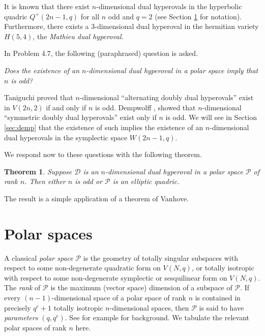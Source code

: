 \documentclass{amsart}
\theoremstyle{plain}
\newtheorem{theorem}{Theorem}
\theoremstyle{definition}
\begin{document}
It is known \cite{Yoshiara2006} that there exist $n$-dimensional dual hyperovals in the hyperbolic quadric $Q^{+}(2n-1,q)$ for all $n$ odd and $q=2$ (see Section \ref{sec:polar} for notation). Furthermore, there exists a $3$-dimensional dual hyperoval in the hermitian variety $H(5,4)$, the \emph{Mathieu dual hyperoval}. 

In \cite{Yoshiara2006} Problem 4.7, the following (paraphrased) question is asked.

{\it Does the existence of an $n$-dimensional dual hyperoval in a polar space imply that $n$ is odd?}

Taniguchi \cite{Taniguchi2009} proved that $n$-dimensional ``alternating doubly dual hyperovals'' exist in $V(2n,2)$ if and only if $n$ is odd. Dempwolff \cite{Dempwolff2015}, showed that $n$-dimensional ``symmetric doubly dual hyperovals'' exist only if $n$ is odd. We will see in Section \ref{sec:demp} that the existence of such implies the existence of an $n$-dimensional dual hyperovals in the symplectic space $W(2n-1,q)$.

We respond now to these questions with the following theorem.

\begin{theorem}\label{thm:main}
Suppose ${\mathcal D}$ is an $n$-dimensional dual hyperoval in a polar space ${\mathcal{P}}$ of rank $n$. Then either $n$ is odd or ${\mathcal{P}}$ is an elliptic quadric. 
\end{theorem}

The result is a simple application of a theorem of Vanhove.

\section{Polar spaces}
\label{sec:polar}

A classical \emph{polar space} ${\mathcal{P}}$ is the geometry of totally singular subspaces with respect to some non-degenerate quadratic form on $V(N,q)$, or totally isotropic with respect to some non-degenerate symplectic or sesquilinear form on $V(N,q)$. The \emph{rank} of ${\mathcal{P}}$ is the maximum (vector space) dimension of a subspace of ${\mathcal{P}}$. If every $(n-1)$-dimensional space of a polar space of rank $n$ is contained in precisely $q^e+1$  totally isotropic $n$-dimensional spaces, then ${\mathcal{P}}$ is said to have \emph{parameters} $(q,q^e)$. See for example \cite{DeBKlMe2011} for background. We tabulate the relevant polar spaces of rank $n$ here. 
\end{document}
